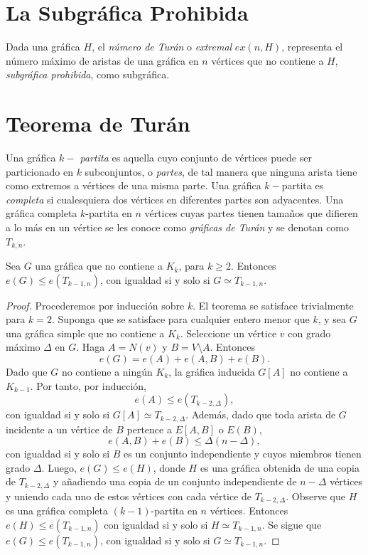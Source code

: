 
\section{La Subgráfica Prohibida}
Dada una gráfica $H$, el \textit{número de Turán} o \textit{extremal}
$ex(n, H)$, representa el número máximo de aristas de una gráfica en
$n$ vértices que no contiene a $H$, \textit{subgráfica prohibida},
como subgráfica.

\section{Teorema de Turán}
Una gráfica \textit{$k-$ partita} es aquella cuyo conjunto de
vértices puede ser particionado en $k$ subconjuntos, o
\textit{partes}, de tal manera que ninguna arista tiene como extremos
a vértices de una misma parte. Una gráfica $k-$partita es
\textit{completa} si cualesquiera dos vértices en diferentes partes
son adyacentes. Una gráfica completa $k$-partita en $n$ vértices
cuyas partes tienen tamaños que difieren a lo más en un vértice se
les conoce como  \textit{gráficas de Turán} y se denotan como $T_{k, n}$.

\begin{theorem} \label{turan}
  Sea $G$ una gráfica que no contiene a $K_k$, para $k \geq
  2$. Entonces $e(G) \leq e(T_{{k-1}, n})$, con igualdad si y solo si
  $G \simeq T_{{k-1}, n}$.
\end{theorem}

\begin{proof}
  Procederemos por inducción sobre $k$. El teorema se satisface
  trivialmente para $k=2$.  Suponga que se satisface para cualquier
  entero menor que $k$, y sea $G$ una gráfica simple que no contiene
  a $K_k$. Seleccione un vértice $v$ con grado máximo $\Delta$ en
  $G$. Haga $A = N(v)$ y $B = V \setminus A$. Entonces
  $$e(G) = e(A) + e(A, B) + e(B).$$
  Dado que $G$ no contiene a ningún $K_k$, la gráfica inducida $G[A]$
  no contiene a $K_{k-1}$. Por tanto, por inducción,
  $$e(A) \leq e(T_{k-2, \Delta}),$$
  con igualdad si y solo si $G[A] \simeq T_{{k-2}, \Delta}$. Además,
  dado que toda arista de $G$ incidente a un vértice de $B$ pertence
  a $E[A, B]$ o $E( B )$,
  $$e(A, B) + e(B) \leq \Delta (n - \Delta),$$
  con igualdad si y solo si $B$ es un conjunto independiente y cuyos
  miembros tienen grado $\Delta$. Luego, $e(G) \leq e(H)$, donde $H$
  es una gráfica obtenida de una copia de $T_{{k-2}, \Delta}$ y
  añadiendo una copia de un conjunto independiente de $n-\Delta$
  vértices y uniendo cada uno de estos vértices con cada vértice de
  $T_{{k-2}, \Delta}$. Observe que $H$ es una gráfica completa
  $(k-1)$-partita en $n$ vértices. Entonces $e(H) \leq e(T_{{k-1},
  n})$ con igualdad si y solo si $H \simeq T_{{k-1}, n}$. Se sigue
  que $e(G) \leq e(T_{k-1, n})$, con igualdad si y solo si $G \simeq
  T_{k-1, n}$.
\end{proof}

